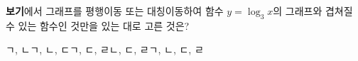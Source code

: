 \textbf{보기}에서 그래프를 평행이동 또는 대칭이동하여 함수 $y=\log_3 x$의 그래프와 겹쳐질 수 있는 함수인 것만을 있는 대로 고른 것은? 
\begin{choices32}{ㄱ, ㄴ}{ㄱ, ㄴ, ㄷ}{ㄱ, ㄷ, ㄹ}{ㄴ, ㄷ, ㄹ}{ㄱ, ㄴ, ㄷ, ㄹ}\end{choices32}
